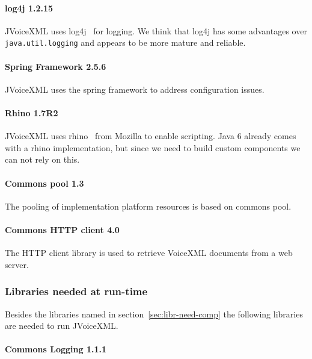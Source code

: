\documentclass[11pt,a4paper]{article}
\begin{document}
\paragraph{log4j 1.2.15}

JVoiceXML uses log4j~\cite{apache:log4j} for logging. We think that log4j has 
some advantages
over \texttt{java.util.logging} and appears to be more mature and reliable.

\paragraph{Spring Framework 2.5.6}
\label{sec:spring-framework}

JVoiceXML uses the spring framework to address configuration issues.

\paragraph{Rhino 1.7R2}

JVoiceXML uses rhino~\cite{rhino} from Mozilla to enable scripting.
Java 6 already comes with a rhino implementation, but since we need to
build custom components we can not rely on this.

\paragraph{Commons pool 1.3}

The pooling of implementation platform resources is based on commons
pool.

\paragraph{Commons HTTP client 4.0}

The HTTP client library is used to retrieve VoiceXML documents from a web
server.

\subsubsection{Libraries needed at run-time}

Besides the libraries named in section~\ref{sec:libr-need-comp} the following
libraries are needed to run JVoiceXML.

\paragraph{Commons Logging 1.1.1}
\label{sec:commons-logging}
\end{document}
